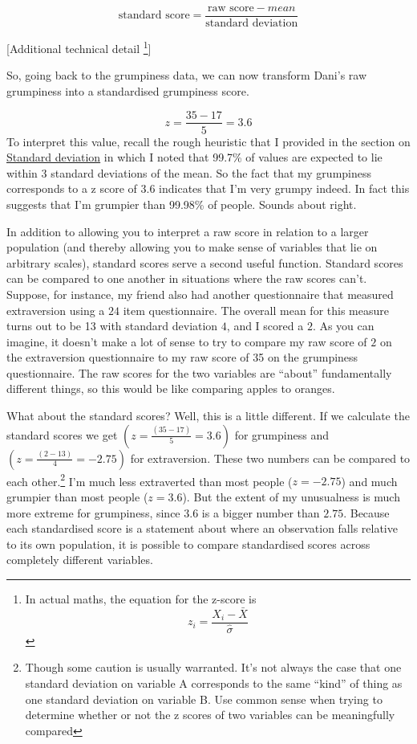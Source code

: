 \documentclass[
]{book}
\begin{document}
\[
\text{standard score} = \frac{\text{raw score} - mean}{\text{standard deviation}}
\]

{{[}Additional technical detail \footnote{In actual maths, the equation for the z-score is \[z_i =\frac{X_i - \bar{X}}{\hat{\sigma}}\]}{]}}

So, going back to the grumpiness data, we can now transform Dani's raw grumpiness into a standardised grumpiness score.

\[ z =\frac{35 - 17}{5} = 3.6 \] To interpret this value, recall the rough heuristic that I provided in the section on \protect\hyperlink{standard-deviation}{Standard deviation} in which I noted that 99.7\% of values are expected to lie within 3 standard deviations of the mean. So the fact that my grumpiness corresponds to a z score of 3.6 indicates that I'm very grumpy indeed. In fact this suggests that I'm grumpier than 99.98\% of people. Sounds about right.

In addition to allowing you to interpret a raw score in relation to a larger population (and thereby allowing you to make sense of variables that lie on arbitrary scales), standard scores serve a second useful function. Standard scores can be compared to one another in situations where the raw scores can't. Suppose, for instance, my friend also had another questionnaire that measured extraversion using a \(24\) item questionnaire. The overall mean for this measure turns out to be 13 with standard deviation \(4\), and I scored a \(2\). As you can imagine, it doesn't make a lot of sense to try to compare my raw score of \(2\) on the extraversion questionnaire to my raw score of 35 on the grumpiness questionnaire. The raw scores for the two variables are ``about'' fundamentally different things, so this would be like comparing apples to oranges.

What about the standard scores? Well, this is a little different. If we calculate the standard scores we get \((z = \frac{(35-17)}{5}=3.6)\) for grumpiness and \((z = \frac{(2-13)}{4}=-2.75)\) for extraversion. These two numbers can be compared to each other.\footnote{Though some caution is usually warranted. It's not always the case that one standard deviation on variable A corresponds to the same ``kind'' of thing as one standard deviation on variable B. Use common sense when trying to determine whether or not the z scores of two variables can be meaningfully compared} I'm much less extraverted than most people (\(z = -2.75\)) and much grumpier than most people (\(z=3.6\)). But the extent of my unusualness is much more extreme for grumpiness, since \(3.6\) is a bigger number than \(2.75\). Because each standardised score is a statement about where an observation falls relative to its own population, it is possible to compare standardised scores across completely different variables.
\end{document}
